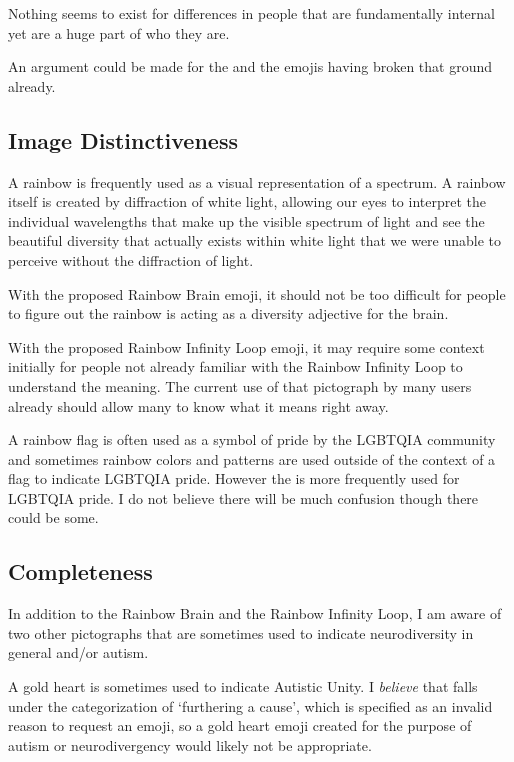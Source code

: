 Nothing seems to exist for differences in people that are fundamentally internal yet are a
huge part of who they are.

An argument could be made for the \nerdface{} and the
\prideflag{} emojis having broken that ground already.

\subsection{Image Distinctiveness}

A rainbow is frequently used as a visual representation of a spectrum. A rainbow itself is
created by diffraction of white light, allowing our eyes to interpret the individual
wavelengths that make up the visible spectrum of light and see the beautiful diversity that
actually exists within white light that we were unable to perceive without the diffraction of
light.

With the proposed Rainbow Brain emoji, it should not be too difficult for people to figure out
the rainbow is acting as a diversity adjective for the brain.

With the proposed Rainbow Infinity Loop emoji, it may require some context initially for people
not already familiar with the Rainbow Infinity Loop to understand the meaning. The current use
of that pictograph by many users already should allow many to know what it means right away.

A rainbow flag is often used as a symbol of pride by the LGBTQIA community and sometimes rainbow colors
and patterns are used outside of the context of a flag to indicate LGBTQIA pride. However the
\prideflag{} is more frequently used for
LGBTQIA pride. I do not believe there will be much confusion though there could be some.

\subsection{Completeness}

In addition to the Rainbow Brain and the Rainbow Infinity Loop, I am aware of two other pictographs
that are sometimes used to indicate neurodiversity in general and/or autism.

A gold heart is sometimes used to indicate Autistic Unity. I \emph{believe} that falls under the
categorization of `furthering a cause', which is specified as an invalid reason to request an emoji,
so a gold heart emoji created for the purpose of autism or neurodivergency would likely not be
appropriate.

